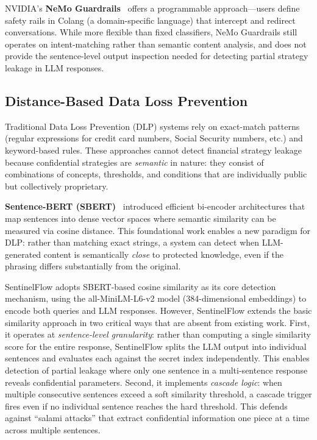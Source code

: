 \documentclass[journal]{IEEEtran}
\begin{document}
NVIDIA's \textbf{NeMo Guardrails}~\cite{nemo_guardrails} offers a programmable approach---users define safety rails in Colang (a domain-specific language) that intercept and redirect conversations. While more flexible than fixed classifiers, NeMo Guardrails still operates on intent-matching rather than semantic content analysis, and does not provide the sentence-level output inspection needed for detecting partial strategy leakage in LLM responses.

\subsection{Distance-Based Data Loss Prevention}
\label{Sect:LR_DLP}

Traditional Data Loss Prevention (DLP) systems rely on exact-match patterns (regular expressions for credit card numbers, Social Security numbers, etc.) and keyword-based rules. These approaches cannot detect financial strategy leakage because confidential strategies are \textit{semantic} in nature: they consist of combinations of concepts, thresholds, and conditions that are individually public but collectively proprietary.

\textbf{Sentence-BERT (SBERT)}~\cite{sbert} introduced efficient bi-encoder architectures that map sentences into dense vector spaces where semantic similarity can be measured via cosine distance. This foundational work enables a new paradigm for DLP: rather than matching exact strings, a system can detect when LLM-generated content is semantically \textit{close} to protected knowledge, even if the phrasing differs substantially from the original.

SentinelFlow adopts SBERT-based cosine similarity as its core detection mechanism, using the all-MiniLM-L6-v2 model (384-dimensional embeddings) to encode both queries and LLM responses. However, SentinelFlow extends the basic similarity approach in two critical ways that are absent from existing work. First, it operates at \textit{sentence-level granularity}: rather than computing a single similarity score for the entire response, SentinelFlow splits the LLM output into individual sentences and evaluates each against the secret index independently. This enables detection of partial leakage where only one sentence in a multi-sentence response reveals confidential parameters. Second, it implements \textit{cascade logic}: when multiple consecutive sentences exceed a soft similarity threshold, a cascade trigger fires even if no individual sentence reaches the hard threshold. This defends against ``salami attacks'' that extract confidential information one piece at a time across multiple sentences.
\end{document}
